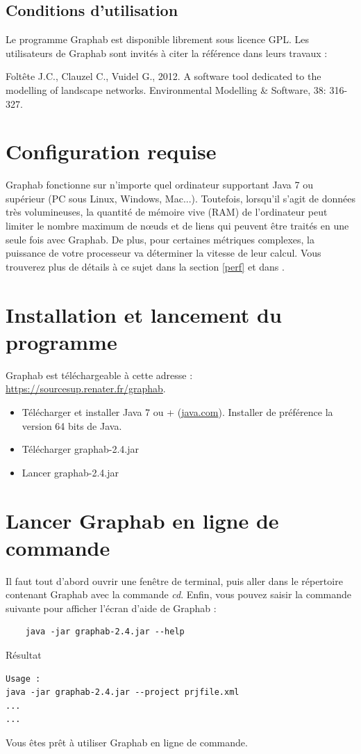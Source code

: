 \documentclass[a4paper,10pt]{report}
\begin{document}
\subsection{Conditions d’utilisation}
Le programme Graphab est disponible librement sous licence GPL. Les utilisateurs de Graphab sont invités à citer la référence \cite{2012_graphab_EMS} dans leurs travaux :

Foltête J.C., Clauzel C., Vuidel G., 2012. A software tool dedicated to the modelling of landscape networks. Environmental Modelling \& Software, 38: 316-327.


\section{Configuration requise}

Graphab fonctionne sur n'importe quel ordinateur supportant Java 7 ou supérieur (PC sous Linux, Windows, Mac...). Toutefois, lorsqu'il s'agit de données très volumineuses, la quantité de mémoire vive (RAM) de l’ordinateur peut limiter le nombre maximum de nœuds et de liens qui peuvent être traités en une seule fois avec Graphab. De plus, pour certaines métriques complexes, la puissance de votre processeur va déterminer la vitesse de leur calcul. Vous trouverez plus de détails à ce sujet dans la section \ref{perf} et dans \cite{2012_graphab_EMS}.

\section{Installation et lancement du programme}

Graphab est téléchargeable à cette adresse : \url{https://sourcesup.renater.fr/graphab}.

\begin{itemize}
	\item Télécharger et installer Java 7 ou + (\href{http://www.java.com}{java.com}). Installer de préférence la version 64 bits de Java.
	\item Télécharger graphab-2.4.jar
	\item Lancer graphab-2.4.jar
\end{itemize}

\section{Lancer Graphab en ligne de commande}
Il faut tout d'abord ouvrir une fenêtre de terminal, puis aller dans le répertoire contenant Graphab avec la commande \textit{cd}.
Enfin, vous pouvez saisir la commande suivante pour afficher l'écran d'aide de Graphab :
\begin{Verbatim}
	java -jar graphab-2.4.jar --help
\end{Verbatim}
Résultat
\begin{Verbatim}
Usage :
java -jar graphab-2.4.jar --project prjfile.xml
...
...
\end{Verbatim}
Vous êtes prêt à utiliser Graphab en ligne de commande.
\end{document}
